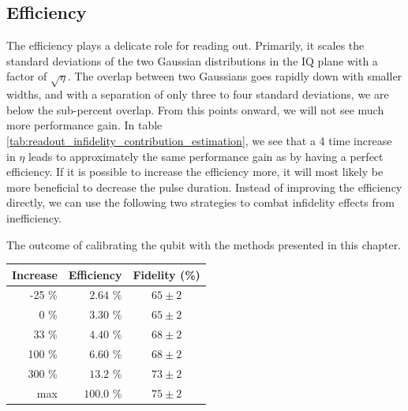 \subsection{Efficiency}
The efficiency plays a delicate role for reading out. Primarily, it scales the standard deviations of the two Gaussian distributions in the IQ plane with a factor of $\sqrt{\eta}$. The overlap between two Gaussians goes rapidly down with smaller widths, and with a separation of only three to four standard deviations, we are below the sub-percent overlap. From this points onward, we will not see much more performance gain. In table \ref{tab:readout_infidelity_contribution_estimation}, we see that a 4 time increase in $\eta$ leads to approximately the same performance gain as by having a perfect efficiency. If it is possible to increase the efficiency more, it will most likely be more beneficial to decrease the pulse duration. Instead of improving the efficiency directly, we can use the following two strategies to combat infidelity effects from inefficiency.


\begin{margintable}
\centering
\caption{The outcome of calibrating the qubit with the methods presented in this chapter.}
\begin{tabular}{rr|c}
\hline
\textbf{Increase}       &  Efficiency       & Fidelity (\%)\\ \hline
-25 \%                  &  $\;2.64$ \%        &  $65 \pm 2$\\
0   \%                  &  $\;3.30$ \%        &  $65 \pm 2$\\
33  \%                  &  $\;4.40$ \%        &  $68 \pm 2$\\
100  \%                 &  $\;6.60$ \%        &  $68 \pm 2$\\
300  \%                 &  $13.2$ \%          &  $73 \pm 2$\\
max                     &  $100.0$ \%         &  $75 \pm 2$\\
\end{tabular}
\label{tab:readout_infidelity_contribution_estimation}
\end{margintable}


